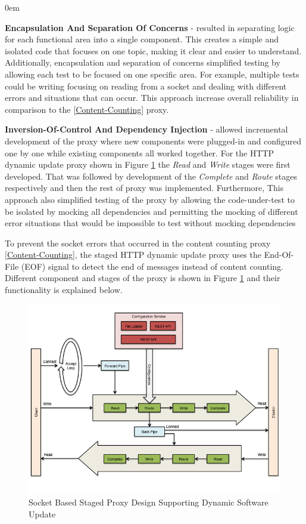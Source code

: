 \documentclass[a4paper,11pt,twoside]{report}
\begin{document}
\begin{list}{-}{}
  \itemsep0em
  \item\textbf{Encapsulation And Separation Of Concerns} - resulted in separating logic for each functional area into a single component. This creates a simple and isolated code that focuses on one topic, making it clear and easier to understand. Additionally, encapsulation and separation of concerns simplified testing by allowing each test to be focused on one specific area. For example, multiple tests could be writing focusing on reading from a socket and dealing with different errors and situations that can occur.  This approach increase overall reliability in comparison to the \ref{Content-Counting} proxy. 

  \item\textbf{Inversion-Of-Control And Dependency Injection} - allowed incremental development of the proxy where new components were plugged-in and configured one by one while existing components all worked together. For the HTTP dynamic update proxy shown in Figure \ref{proxy} the \textit{Read} and \textit{Write} stages were first developed. That was followed by development of the  \textit{Complete} and \textit{Route} stages respectively and then the rest of proxy was implemented. Furthermore, This approach also simplified testing of the proxy by allowing the code-under-test to be isolated by mocking all dependencies and permitting the mocking of different error situations that would be impossible to test without mocking dependencies  
\end{list}

\noindent
To prevent the socket errors that occurred in the content counting proxy \ref{Content-Counting}, the staged HTTP dynamic update proxy uses the End-Of-File (EOF) signal to detect the end of messages instead of content counting. Different component and stages of the proxy is shown in Figure \ref{proxy} and their functionality is explained below.\bigskip

\begin{figure}[!ht]
  \centering
     \includegraphics[scale=0.30]{proxy}
  \caption{Socket Based Staged Proxy Design Supporting Dynamic Software Update}
  \label{proxy}
\end{figure}
\end{document}
